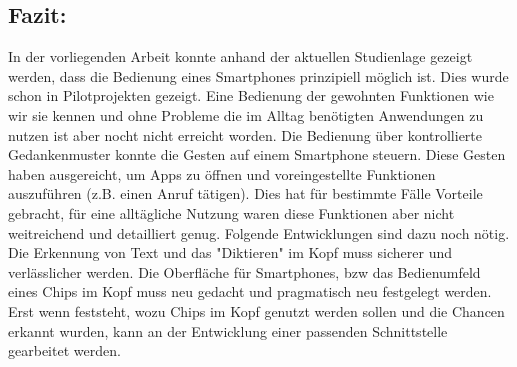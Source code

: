 \subsection{Fazit:}
In der vorliegenden Arbeit konnte anhand der aktuellen Studienlage gezeigt werden, dass die Bedienung eines Smartphones prinzipiell möglich ist. Dies wurde schon in Pilotprojekten gezeigt. Eine Bedienung der gewohnten Funktionen wie wir sie kennen und ohne Probleme die im Alltag benötigten Anwendungen zu nutzen ist aber nocht nicht erreicht worden.
Die Bedienung über kontrollierte Gedankenmuster konnte die Gesten auf einem Smartphone steuern. Diese Gesten haben ausgereicht, um Apps zu öffnen und voreingestellte Funktionen auszuführen (z.B. einen Anruf tätigen). Dies hat für bestimmte Fälle Vorteile gebracht, für eine alltägliche Nutzung waren diese Funktionen aber nicht weitreichend und detailliert genug.
Folgende Entwicklungen sind dazu noch nötig. Die Erkennung von Text und das "Diktieren" im Kopf muss sicherer und verlässlicher werden. Die Oberfläche für Smartphones, bzw das Bedienumfeld eines Chips im Kopf muss neu gedacht und pragmatisch neu festgelegt werden. Erst wenn feststeht, wozu Chips im Kopf genutzt werden sollen und die Chancen erkannt wurden, kann an der Entwicklung einer passenden Schnittstelle gearbeitet werden.
